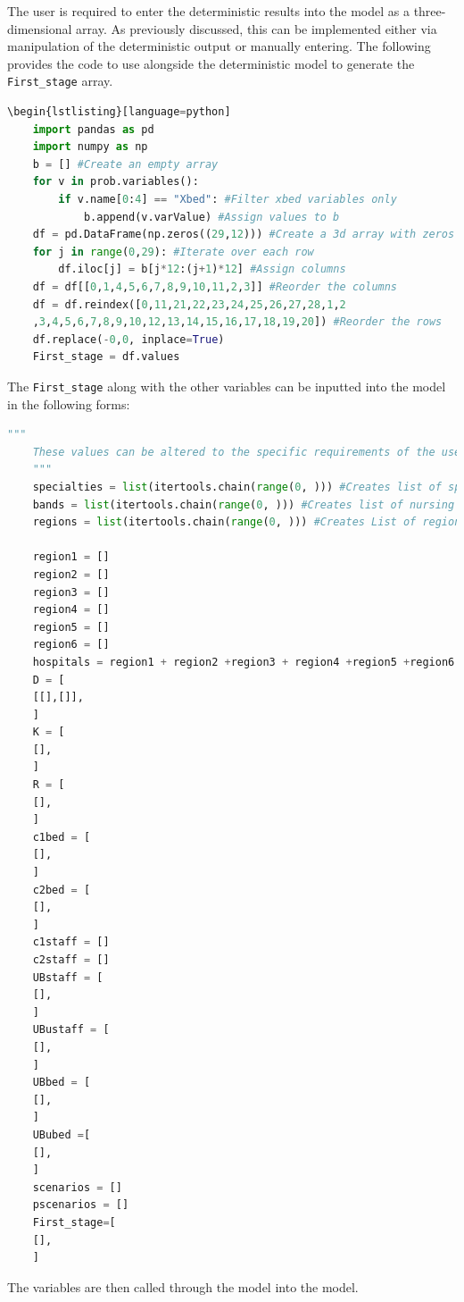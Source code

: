 \documentclass[../thesis.tex]{subfiles}
\begin{document}
The user is required to enter the deterministic results into the model as a three-dimensional array. As previously discussed, this can be implemented either via manipulation of the deterministic output or manually entering. The following provides the code to use alongside the deterministic model to generate the \texttt{First\_stage} array.

\begin{lstlisting}[language=python]
\begin{lstlisting}[language=python]
    import pandas as pd
    import numpy as np
    b = [] #Create an empty array
    for v in prob.variables(): 
        if v.name[0:4] == "Xbed": #Filter xbed variables only
            b.append(v.varValue) #Assign values to b
    df = pd.DataFrame(np.zeros((29,12))) #Create a 3d array with zeros
    for j in range(0,29): #Iterate over each row
        df.iloc[j] = b[j*12:(j+1)*12] #Assign columns
    df = df[[0,1,4,5,6,7,8,9,10,11,2,3]] #Reorder the columns
    df = df.reindex([0,11,21,22,23,24,25,26,27,28,1,2
    ,3,4,5,6,7,8,9,10,12,13,14,15,16,17,18,19,20]) #Reorder the rows
    df.replace(-0,0, inplace=True)
    First_stage = df.values
\end{lstlisting}

The \texttt{First\_stage} along with the other variables can be inputted into the model in the following forms:

\begin{lstlisting}[language=python]
    """
    These values can be altered to the specific requirements of the user
    """
    specialties = list(itertools.chain(range(0, ))) #Creates list of specialties
    bands = list(itertools.chain(range(0, ))) #Creates list of nursing bands
    regions = list(itertools.chain(range(0, ))) #Creates List of regions

    region1 = []
    region2 = []
    region3 = []
    region4 = []
    region5 = []
    region6 = []
    hospitals = region1 + region2 +region3 + region4 +region5 +region6
    D = [
    [[],[]],
    ]
    K = [
    [],
    ]
    R = [
    [],
    ] 
    c1bed = [
    [],
    ]
    c2bed = [
    [],
    ]
    c1staff = []
    c2staff = []
    UBstaff = [
    [],
    ]
    UBustaff = [
    [],
    ]
    UBbed = [
    [],
    ]
    UBubed =[
    [],
    ]
    scenarios = []
    pscenarios = []
    First_stage=[
    [],
    ]
\end{lstlisting}
The variables are then called through the model into the model.
\end{document}
